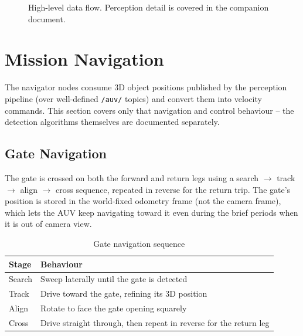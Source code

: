 \documentclass[11pt,a4paper]{article}
\newcommand{\nl}{\newline}
\begin{document}
\begin{figure}[H]
\centering
{}
\caption{High-level data flow. Perception detail is covered in the companion document.}
\end{figure}

\section{Mission Navigation}

The navigator nodes consume 3D object positions published by the perception
pipeline (over well-defined \texttt{/auv/} topics) and convert them into
velocity commands. This section covers only that navigation and control
behaviour -- the detection algorithms themselves are documented separately.

\subsection{Gate Navigation}

The gate is crossed on both the forward and return legs using a search
$\to$ track $\to$ align $\to$ cross sequence, repeated in reverse for the
return trip. The gate's position is stored in the world-fixed odometry
frame (not the camera frame), which lets the AUV keep navigating toward it
even during the brief periods when it is out of camera view.

\begin{table}[H]
\centering
\caption{Gate navigation sequence}
\begin{tabular}{L{2.6cm} L{9.8cm}}
  \toprule
  \textbf{Stage} & \textbf{Behaviour} \\
  \midrule
  Search  & Sweep laterally until the gate is detected \\
  Track   & Drive toward the gate, refining its 3D position \\
  Align   & Rotate to face the gate opening squarely \\
  Cross   & Drive straight through, then repeat in reverse for the return leg \\
  \bottomrule
\end{tabular}
\end{table}
\end{document}
